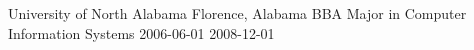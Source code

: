 \educationitem
{University of North Alabama}
{Florence, Alabama}
{BBA Major in Computer Information Systems}
{2006-06-01}
{2008-12-01}